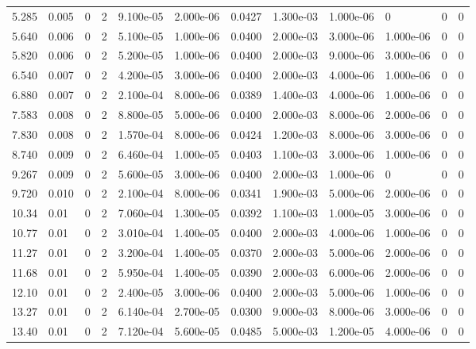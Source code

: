 \documentclass[preview]{standalone}
\begin{document}
{{\begin{tabular}{L{1.2cm}C{1.2cm} C{0.3cm}C{0.5cm} C{1.4cm}C{1.4cm} C{1.4cm}C{1.4cm} C{1.6cm}C{1.6cm} C{1.6cm}C{1.6cm}}
  5.285  &  0.005  & 0     &  2 &  9.100e-05  & 2.000e-06  &  0.0427&   1.300e-03& 1.000e-06 & 0   &  0 & 0  \\ 
  5.640  &  0.006  & 0     &  2 &  5.100e-05  & 1.000e-06  &  0.0400&   2.000e-03& 3.000e-06 & 1.000e-06   &  0 & 0  \\ 
  5.820  &  0.006  & 0     &  2 &  5.200e-05  & 1.000e-06  &  0.0400&   2.000e-03& 9.000e-06 & 3.000e-06   &  0 & 0  \\ 
  6.540  &  0.007  & 0     &  2 &  4.200e-05  & 3.000e-06  &  0.0400&   2.000e-03& 4.000e-06 & 1.000e-06   &  0 & 0  \\ 
  6.880  &  0.007  & 0     &  2 &  2.100e-04  & 8.000e-06  &  0.0389&   1.400e-03& 4.000e-06 & 1.000e-06   &  0 & 0  \\ 
  7.583  &  0.008  & 0     &  2 &  8.800e-05  & 5.000e-06  &  0.0400&   2.000e-03& 8.000e-06 & 2.000e-06   &  0 & 0  \\ 
  7.830  &  0.008  & 0     &  2 &  1.570e-04  & 8.000e-06  &  0.0424&   1.200e-03& 8.000e-06 & 3.000e-06   &  0 & 0  \\ 
  8.740  &  0.009  & 0     &  2 &  6.460e-04  & 1.000e-05  &  0.0403&   1.100e-03& 3.000e-06 & 1.000e-06   &  0 & 0  \\ 
  9.267  &  0.009  & 0     &  2 &  5.600e-05  & 3.000e-06  &  0.0400&   2.000e-03& 1.000e-06 & 0   &  0 & 0  \\ 
  9.720  &  0.010  & 0     &  2 &  2.100e-04  & 8.000e-06  &  0.0341&   1.900e-03& 5.000e-06 & 2.000e-06   &  0 & 0  \\ 
  10.34  &  0.01  & 0     &  2 &  7.060e-04  & 1.300e-05  &  0.0392&   1.100e-03& 1.000e-05 & 3.000e-06   &  0 & 0  \\ 
  10.77  &  0.01  & 0     &  2 &  3.010e-04  & 1.400e-05  &  0.0400&   2.000e-03& 4.000e-06 & 1.000e-06   &  0 & 0  \\ 
  11.27  &  0.01  & 0     &  2 &  3.200e-04  & 1.400e-05  &  0.0370&   2.000e-03& 5.000e-06 & 2.000e-06   &  0 & 0  \\ 
  11.68  &  0.01  & 0     &  2 &  5.950e-04  & 1.400e-05  &  0.0390&   2.000e-03& 6.000e-06 & 2.000e-06   &  0 & 0  \\ 
  12.10  &  0.01  & 0     &  2 &  2.400e-05  & 3.000e-06  &  0.0400&   2.000e-03& 5.000e-06 & 1.000e-06   &  0 & 0  \\ 
  13.27  &  0.01  & 0     &  2 &  6.140e-04  & 2.700e-05  &  0.0300&   9.000e-03& 8.000e-06 & 3.000e-06   &  0 & 0  \\ 
  13.40  &  0.01  & 0     &  2 &  7.120e-04  & 5.600e-05  &  0.0485&   5.000e-03& 1.200e-05 & 4.000e-06   &  0 & 0  \\ 

\end{tabular}}}
\end{document}
